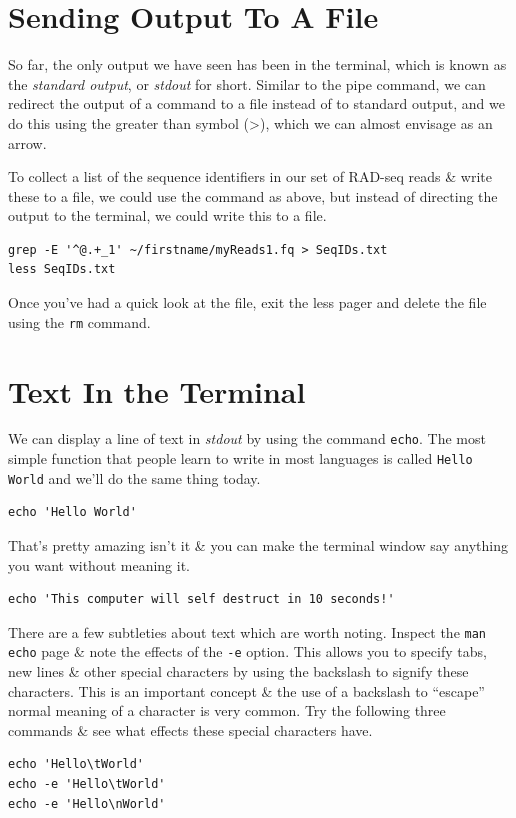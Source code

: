 \documentclass[a4paper,12pt,twoside]{memoir}
\begin{document}
\section{Sending Output To A File}
\begin{information}
So far, the only output we have seen has been in the terminal, which is known as the \textit{standard output}, or \textit{stdout} for short.
Similar to the pipe command, we can redirect the output of a command to a file instead of to standard output, and we do this using the greater than symbol (\textgreater), which we can almost envisage as an arrow.
\end{information}

\begin{steps}
To collect a list of the sequence identifiers in our set of RAD-seq reads \& write these to a file, we could use the command as above, but instead of directing the output to the terminal, we could write this to a file.
\end{steps}
\begin{lstlisting}
grep -E '^@.+_1' ~/firstname/myReads1.fq > SeqIDs.txt
less SeqIDs.txt
\end{lstlisting}

Once you've had a quick look at the file, exit the less pager and delete the file using the \texttt{rm} command.

\section{Text In the Terminal}
We can display a line of text in \textit{stdout} by using the command \texttt{echo}.
The most simple function that people learn to write in most languages is called \texttt{Hello World} and we'll do the same thing today.
\begin{steps}
\begin{lstlisting}
echo 'Hello World'
\end{lstlisting}
\end{steps}
That's pretty amazing isn't it \& you can make the terminal window say anything you want without meaning it.\\
\begin{lstlisting}
echo 'This computer will self destruct in 10 seconds!'
\end{lstlisting}

\begin{information}
There are a few subtleties about text which are worth noting.
Inspect the \texttt{man echo} page \& note the effects of the \texttt{-e} option.
This allows you to specify tabs, new lines \& other special characters by using the backslash to signify these characters.
This is an important concept \& the use of a backslash to ``escape'' normal meaning of a character is very common.
Try the following three commands \& see what effects these special characters have.
\end{information}
\begin{steps}
\begin{lstlisting}
echo 'Hello\tWorld'
echo -e 'Hello\tWorld'
echo -e 'Hello\nWorld'
\end{lstlisting}
\end{steps}
\end{document}
